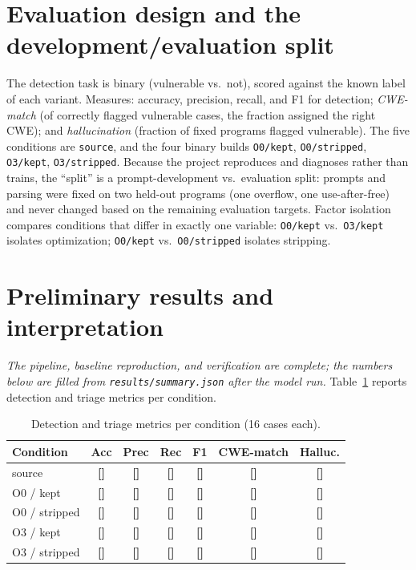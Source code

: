\documentclass[10pt]{article}
\newcommand{\placeholder}[1]{{\color{red}\textbf{[#1]}}}
\begin{document}
\section{Evaluation design and the development/evaluation split}
The detection task is binary (vulnerable vs.\ not), scored against the known
label of each variant. Measures: accuracy, precision, recall, and F1 for
detection; \emph{CWE-match} (of correctly flagged vulnerable cases, the fraction
assigned the right CWE); and \emph{hallucination} (fraction of fixed programs
flagged vulnerable). The five conditions are \texttt{source}, and the four binary
builds \texttt{O0/kept}, \texttt{O0/stripped}, \texttt{O3/kept},
\texttt{O3/stripped}. Because the project reproduces and diagnoses rather than
trains, the ``split'' is a prompt-development vs.\ evaluation split: prompts and
parsing were fixed on two held-out programs (one overflow, one use-after-free)
and never changed based on the remaining evaluation targets. Factor isolation
compares conditions that differ in exactly one variable: \texttt{O0/kept} vs.\
\texttt{O3/kept} isolates optimization; \texttt{O0/kept} vs.\ \texttt{O0/stripped}
isolates stripping.

\section{Preliminary results and interpretation}
\emph{The pipeline, baseline reproduction, and verification are complete; the
numbers below are filled from \texttt{results/summary.json} after the model run.}
Table~\ref{tab:results} reports detection and triage metrics per condition.

\begin{table}[h]
\centering
\small
\begin{tabular}{lcccccc}
\toprule
Condition & Acc & Prec & Rec & F1 & CWE-match & Halluc. \\
\midrule
source       & \placeholder{} & \placeholder{} & \placeholder{} & \placeholder{} & \placeholder{} & \placeholder{} \\
O0 / kept     & \placeholder{} & \placeholder{} & \placeholder{} & \placeholder{} & \placeholder{} & \placeholder{} \\
O0 / stripped & \placeholder{} & \placeholder{} & \placeholder{} & \placeholder{} & \placeholder{} & \placeholder{} \\
O3 / kept     & \placeholder{} & \placeholder{} & \placeholder{} & \placeholder{} & \placeholder{} & \placeholder{} \\
O3 / stripped & \placeholder{} & \placeholder{} & \placeholder{} & \placeholder{} & \placeholder{} & \placeholder{} \\
\bottomrule
\end{tabular}
\caption{Detection and triage metrics per condition (16 cases each).}
\label{tab:results}
\end{table}
\end{document}
